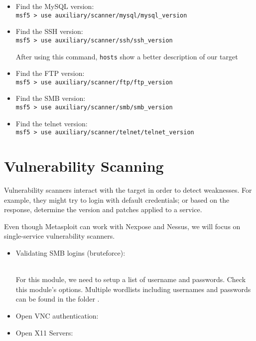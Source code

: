 \begin{itemize}
    \item Find the MySQL version:\\
    \noindent\texttt{msf5 > use auxiliary/scanner/mysql/mysql\_version}
    \item Find the SSH version:\\
    \noindent\texttt{msf5 > use auxiliary/scanner/ssh/ssh\_version} \\ 
    \begin{infobox}[innermargin=-25pt]
        After using this command, \texttt{hosts} show a better description of our target
    \end{infobox}
    \item Find the FTP version:\\
    \noindent\texttt{msf5 > use auxiliary/scanner/ftp/ftp\_version}
    \item Find the SMB version:\\
    \noindent\texttt{msf5 > use auxiliary/scanner/smb/smb\_version}
    \item Find the telnet version:\\
    \noindent\texttt{msf5 > use auxiliary/scanner/telnet/telnet\_version}
\end{itemize}

\section{Vulnerability Scanning}

Vulnerability scanners interact with the target in order to detect weaknesses. For example, they might try to login with default credentials; or based on the response, determine the version and patches applied to a service.

Even though Metasploit can work with Nexpose and Nessus, we will focus on single-service vulnerability scanners.

\begin{itemize}
    \item Validating SMB logins (bruteforce):\\
     \\ 
    \begin{warnbox}[outermargin=-25pt]
        For this module, we need to setup a list of username and passwords. Check this module's options. Multiple wordlists including usernames and passwords can be found in the folder .
    \end{warnbox}
    \item Open VNC authentication:\\
    \item Open X11 Servers:\\
\end{itemize}

